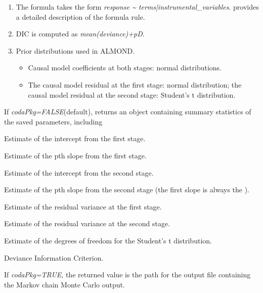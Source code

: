 \documentclass[a4paper]{book}
\begin{document}
%
\begin{Details}\relax
\begin{enumerate}

\item The formula takes the form \emph{response \textasciitilde{} terms|instrumental\_variables}.
 provides a detailed description of the formula rule.
\item DIC is computed as \emph{mean(deviance)+pD}.
\item Prior distributions used in ALMOND.
\begin{itemize}

\item Causal model coefficients at both stages: normal distributions.
\item The causal model residual at the first stage: normal distribution;
the causal model residual at the second stage: Student's t distribution.

\end{itemize}


\end{enumerate}

\end{Details}
%
\begin{Value}
If \emph{codaPkg=FALSE}(default), returns an object containing summary statistics of
the saved parameters, including
\begin{ldescription}
\item[\code{s1.intercept}] Estimate of the intercept from the first stage.
\item[\code{s1.slopeP}] Estimate of the pth slope from the first stage. 
\item[\code{s2.intercept}] Estimate of the intercept from the second stage.
\item[\code{s2.slopeP}] Estimate of the pth slope from the second stage (the first slope is always
the ).
\item[\code{var.e.s1}] Estimate of the residual variance at the first stage.
\item[\code{var.e.s2}] Estimate of the residual variance at the second stage.
\item[\code{df.est}] Estimate of the degrees of freedom for the Student's t distribution.
\item[\code{DIC}] Deviance Information Criterion.
\end{ldescription}
If \emph{codaPkg=TRUE}, the returned value is the path for the output file
containing the Markov chain Monte Carlo output.
\end{Value}
\end{document}
